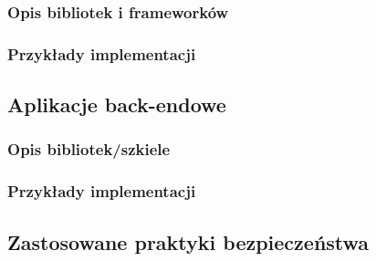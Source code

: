 \subsubsection{Opis bibliotek i frameworków}

\subsubsection{Przykłady implementacji}

\subsection{Aplikacje back-endowe}

\subsubsection{Opis bibliotek/szkiele}

\subsubsection{Przykłady implementacji}

\subsection{Zastosowane praktyki bezpieczeństwa}